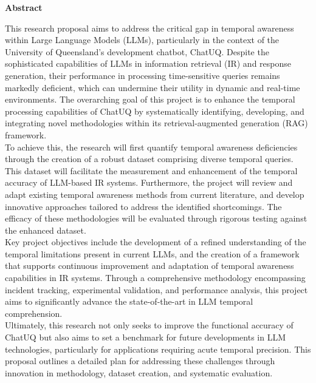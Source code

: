 \centerline{\Large\bfseries Abstract}
\bigskip

This research proposal aims to address the critical gap in temporal awareness within Large Language Models (LLMs), particularly in the context of the University of Queensland's development chatbot, ChatUQ. Despite the sophisticated capabilities of LLMs in information retrieval (IR) and response generation, their performance in processing time-sensitive queries remains markedly deficient, which can undermine their utility in dynamic and real-time environments. The overarching goal of this project is to enhance the temporal processing capabilities of ChatUQ by systematically identifying, developing, and integrating novel methodologies within its retrieval-augmented generation (RAG) framework. \\

To achieve this, the research will first quantify temporal awareness deficiencies through the creation of a robust dataset comprising diverse temporal queries. This dataset will facilitate the measurement and enhancement of the temporal accuracy of LLM-based IR systems. Furthermore, the project will review and adapt existing temporal awareness methods from current literature, and develop innovative approaches tailored to address the identified shortcomings. The efficacy of these methodologies will be evaluated through rigorous testing against the enhanced dataset. \\

Key project objectives include the development of a refined understanding of the temporal limitations present in current LLMs, and the creation of a framework that supports continuous improvement and adaptation of temporal awareness capabilities in IR systems. Through a comprehensive methodology encompassing incident tracking, experimental validation, and performance analysis, this project aims to significantly advance the state-of-the-art in LLM temporal comprehension. \\

Ultimately, this research not only seeks to improve the functional accuracy of ChatUQ but also aims to set a benchmark for future developments in LLM technologies, particularly for applications requiring acute temporal precision. This proposal outlines a detailed plan for addressing these challenges through innovation in methodology, dataset creation, and systematic evaluation.

\thispagestyle{empty} %
\newpage